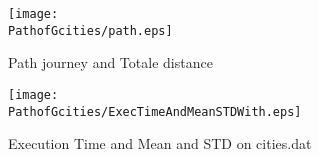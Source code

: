 \begin{figure}[H]
	\begin{minipage}[t]{0.45\linewidth}
	\centering
	\texttt{[image: \\PathofGcities/path.eps]}
	\caption{Path journey and Totale distance}\label{fig:PathofGcities:path}
	
	\end{minipage}\hfill
	\begin{minipage}[t]{0.45\linewidth}
	\centering
	\texttt{[image: \\PathofGcities/ExecTimeAndMeanSTDWith.eps]}
	\caption{Execution Time and Mean and STD on cities.dat}
	\label{fig:PathofGcities:AS_1_5AS_ExecTimeAndMeanSTDWith_execVariation}
	\end{minipage}
\end{figure}